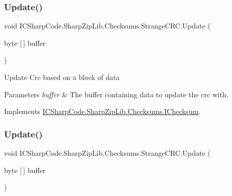 \subsubsection{\texorpdfstring{Update()}{Update()}\hspace{0.1cm}{\footnotesize\ttfamily [3/6]}}
{\footnotesize\ttfamily void I\+C\+Sharp\+Code.\+Sharp\+Zip\+Lib.\+Checksums.\+Strange\+C\+R\+C.\+Update (\begin{DoxyParamCaption}\item[{byte \mbox{[}$\,$\mbox{]}}]{buffer }\end{DoxyParamCaption})\hspace{0.3cm}{\ttfamily [inline]}}



Update Crc based on a block of data 


\begin{DoxyParams}{Parameters}
{\em buffer} & The buffer containing data to update the crc with.\\
\hline
\end{DoxyParams}


Implements \hyperlink{interface_i_c_sharp_code_1_1_sharp_zip_lib_1_1_checksums_1_1_i_checksum_aee26d2b3705b22ab24cc9b5eb9dbc81d}{I\+C\+Sharp\+Code.\+Sharp\+Zip\+Lib.\+Checksums.\+I\+Checksum}.

\mbox{\label{class_i_c_sharp_code_1_1_sharp_zip_lib_1_1_checksums_1_1_strange_c_r_c_aab01b02459d969f26576d15ac7cf3924}} 
\subsubsection{\texorpdfstring{Update()}{Update()}\hspace{0.1cm}{\footnotesize\ttfamily [4/6]}}
{\footnotesize\ttfamily void I\+C\+Sharp\+Code.\+Sharp\+Zip\+Lib.\+Checksums.\+Strange\+C\+R\+C.\+Update (\begin{DoxyParamCaption}\item[{byte \mbox{[}$\,$\mbox{]}}]{buffer }\end{DoxyParamCaption})\hspace{0.3cm}{\ttfamily [inline]}}



